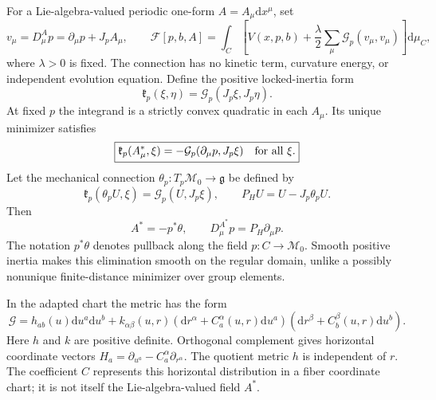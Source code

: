 \documentclass[11pt]{article}
\newcommand{\M}{\mathcal M}
\newcommand{\G}{\mathcal G}
\newcommand{\dd}{\mathrm d}
\begin{document}
For a Lie-algebra-valued periodic one-form $A=A_\mu\dd x^\mu$, set
\begin{equation}
 v_\mu=D^A_\mu p=\partial_\mu p+J_pA_\mu,
 \qquad
 \mathcal F[p,b,A]=\int_C
 \left[V(x,p,b)+\frac\lambda2\sum_\mu\G_p(v_\mu,v_\mu)\right]\dd\mu_C,
 \label{eq:unreduced}
\end{equation}
where $\lambda>0$ is fixed. The connection has no kinetic term, curvature energy, or independent evolution equation. Define the positive locked-inertia form
\begin{equation}
 \mathfrak k_p(\xi,\eta)=\G_p(J_p\xi,J_p\eta).
\end{equation}
At fixed $p$ the integrand is a strictly convex quadratic in each $A_\mu$. Its unique minimizer satisfies
\begin{equation}
 \boxed{\mathfrak k_p(A^*_\mu,\xi)
             =-\G_p(\partial_\mu p,J_p\xi)\quad\hbox{for all }\xi.}
 \label{eq:normal}
\end{equation}
Let the mechanical connection $\theta_p:T_p\M_0\to\mathfrak g$ be defined by
\begin{equation}
 \mathfrak k_p(\theta_pU,\xi)=\G_p(U,J_p\xi),
 \qquad P_HU=U-J_p\theta_pU.
\end{equation}
Then
\begin{equation}
 A^*=-p^*\theta,\qquad D^{A^*}_\mu p=P_H\partial_\mu p.
 \label{eq:mechanical}
\end{equation}
The notation $p^*\theta$ denotes pullback along the field $p:C\to\M_0$. Smooth positive inertia makes this elimination smooth on the regular domain, unlike a possibly nonunique finite-distance minimizer over group elements.

In the adapted chart the metric has the form
\begin{equation}
 \G=h_{ab}(u)\dd u^a\dd u^b+
 k_{\alpha\beta}(u,r)
 (\dd r^\alpha+C^\alpha_a(u,r)\dd u^a)
 (\dd r^\beta+C^\beta_b(u,r)\dd u^b).
 \label{eq:metricdecomp}
\end{equation}
Here $h$ and $k$ are positive definite. Orthogonal complement gives horizontal coordinate vectors $H_a=\partial_{u^a}-C^\alpha_a\partial_{r^\alpha}$. The quotient metric $h$ is independent of $r$. The coefficient $C$ represents this horizontal distribution in a fiber coordinate chart; it is not itself the Lie-algebra-valued field $A^*$.
\end{document}

